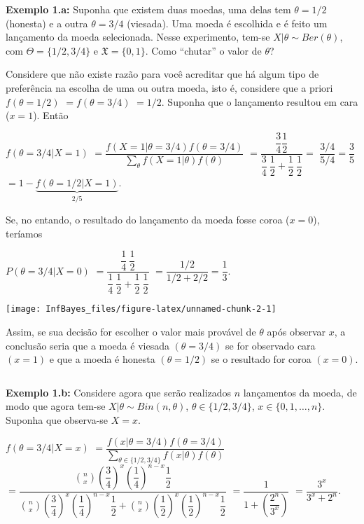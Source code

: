 \documentclass[
]{book}
\begin{document}
\(~\)

\textbf{Exemplo 1.a:} Suponha que existem duas moedas, uma delas tem \(\theta =1/2\) (honesta) e a outra \(\theta=3/4\) (viesada). Uma moeda é escolhida e é feito um lançamento da moeda selecionada. Nesse experimento, tem-se \(X|\theta \sim Ber(\theta)\), com \(\Theta=\{1/2,3/4\}\) e \(\mathfrak{X}=\{0,1\}\). Como ``chutar'' o valor de \(\theta\)?

Considere que não existe razão para você acreditar que há algum tipo de preferência na escolha de uma ou outra moeda, isto é, considere que a priori \(f(\theta=1/2)\) \(=f(\theta=3/4)\) \(=1/2\). Suponha que o lançamento resultou em cara (\(x=1\)). Então

\(f(\theta = 3/4|X=1)\) \(=\dfrac{f(X=1|\theta=3/4)f(\theta=3/4)}{\sum_\theta f(X=1|\theta)f(\theta)}\) \(=\dfrac{\dfrac{3}{4}\dfrac{1}{2}}{\dfrac{3}{4}~\dfrac{1}{2}+\dfrac{1}{2}~\dfrac{1}{2}}=\) \(\dfrac{3/4}{5/4}=\dfrac{3}{5}\) \(= 1-\underbrace{f(\theta=1/2|X=1)}_{2/5}\).

Se, no entando, o resultado do lançamento da moeda fosse coroa (\(x=0\)), teríamos

\(P(\theta=3/4|X=0)\) \(=\dfrac{\dfrac{1}{4}~\dfrac{1}{2}}{\dfrac{1}{4}~\dfrac{1}{2}+\dfrac{1}{2}~\dfrac{1}{2}}\) \(=\dfrac{1/2}{1/2+2/2}=\dfrac{1}{3}\).

\begin{center}\texttt{[image: InfBayes\_files/figure-latex/unnamed-chunk-2-1]} \end{center}

Assim, se sua decisão for escolher o valor mais provável de \(\theta\) após observar \(x\), a conclusão seria que a moeda é viesada \((\theta=3/4)\) se for observado cara \((x=1)\) e que a moeda é honesta \((\theta=1/2)\) se o resultado for coroa \((x=0)\).

\(~\)

\textbf{Exemplo 1.b:} Considere agora que serão realizados \(n\) lançamentos da moeda, de modo que agora tem-se \(X|\theta \sim Bin(n,\theta)\), \(\theta \in \{1/2,3/4\}\), \(x \in \{0,1,\ldots,n\}\). Suponha que observa-se \(X=x\).

\(f(\theta=3/4|X=x)\) \(=\dfrac{f(x|\theta=3/4)f(\theta=3/4)}{\displaystyle \sum_{\theta\in \{1/2,3/4\}}f(x|\theta)f(\theta)}\) \(=\dfrac{\displaystyle \binom{n}{x}\left(\dfrac{3}{4}\right)^x\left(\dfrac{1}{4}\right)^{n-x}\dfrac{1}{2}}{\displaystyle \binom{n}{x}\left(\dfrac{3}{4}\right)^x\left(\dfrac{1}{4}\right)^{n-x}\dfrac{1}{2}+\displaystyle\binom{n}{x}\left(\dfrac{1}{2}\right)^x\left(\dfrac{1}{2}\right)^{n-x}\dfrac{1}{2}}\) \(=\dfrac{1}{1+\left(\dfrac{2^n}{3^x}\right)}\) \(=\dfrac{3^x}{3^x + 2^n}\).
\end{document}
